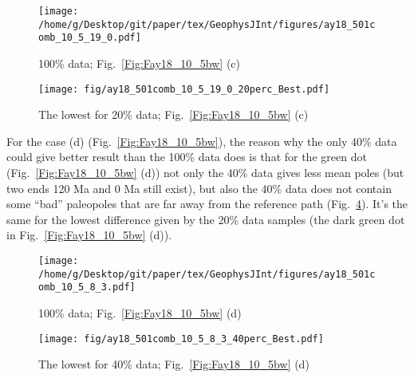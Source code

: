 \begin{figure*}[tbp]
  \captionsetup[subfigure]{labelformat=empty,aboveskip=-6pt,belowskip=-6pt}
  \centering
  \begin{subfigure}[htbp]{.49\textwidth}
    \captionsetup{skip=0pt}
    \centering
    \texttt{[image: /home/g/Desktop/git/paper/tex/GeophysJInt/figures/ay18\_501comb\_10\_5\_19\_0.pdf]}
	\caption{100\% data; Fig.~\ref{Fig:Fay18_10_5bw}
	(c)}\label{Fig:Fay18_10_5b501_}
  \end{subfigure}
  \begin{subfigure}[htbp]{.49\textwidth}
    \captionsetup{skip=0pt}
    \centering
    \texttt{[image: fig/ay18\_501comb\_10\_5\_19\_0\_20perc\_Best.pdf]}  %
    \caption{The lowest for 20\% data;
	Fig.~\ref{Fig:Fay18_10_5bw} (c)}\label{Fig:Fay18_10_5b501l20p}
  \end{subfigure}
  \caption[Less data, better similarity?]{Comparing the 100\% Indian
  120 Ma paleomagnetic data derived result with the best of the only
  20\% data (giving even better similarity) derived results (the dark green dot
  in Fig.~\ref{Fig:Fay18_10_5bw}
  (c)).}\label{Fig:Fay18_10_5b501l20p_vs_100p}
\end{figure*}

For the case (d) (Fig.~\ref{Fig:Fay18_10_5bw}), the reason why the only 40\%
data could give better result than the 100\% data does is that for the green
dot (Fig.~\ref{Fig:Fay18_10_5bw} (d)) not only the 40\% data gives less mean
poles (but two ends 120 Ma and 0 Ma still exist), but also the 40\% data does
not contain some ``bad'' paleopoles that are far away from the reference path
(Fig.~\ref{Fig:Fay18_10_5w501l40p}). It's the same for the lowest difference
given by the 20\% data samples (the dark green dot in
Fig.~\ref{Fig:Fay18_10_5bw} (d)).

\begin{figure*}[tbp]
  \captionsetup[subfigure]{labelformat=empty,aboveskip=-6pt,belowskip=-6pt}
  \centering
  \begin{subfigure}[htbp]{.49\textwidth}
    \captionsetup{skip=0pt}
    \centering
    \texttt{[image: /home/g/Desktop/git/paper/tex/GeophysJInt/figures/ay18\_501comb\_10\_5\_8\_3.pdf]}
	\caption{100\% data; Fig.~\ref{Fig:Fay18_10_5bw}
	(d)}\label{Fig:Fay18_10_5w501}
  \end{subfigure}
  \begin{subfigure}[htbp]{.49\textwidth}
    \captionsetup{skip=0pt}
    \centering
    \texttt{[image: fig/ay18\_501comb\_10\_5\_8\_3\_40perc\_Best.pdf]}  %
    \caption{The lowest for 40\% data;
	Fig.~\ref{Fig:Fay18_10_5bw} (d)}\label{Fig:Fay18_10_5w501l40p}
  \end{subfigure}
  \caption[Less data, better similarity?]{Comparing the 100\% Indian
  120 Ma paleomagnetic data derived result with the best of the only
  40\% data (giving even better similarity) derived results (the green dot in
  Fig.~\ref{Fig:Fay18_10_5bw} (d)).}\label{Fig:Fay18_10_5w501l40p_vs_100p}
\end{figure*}

